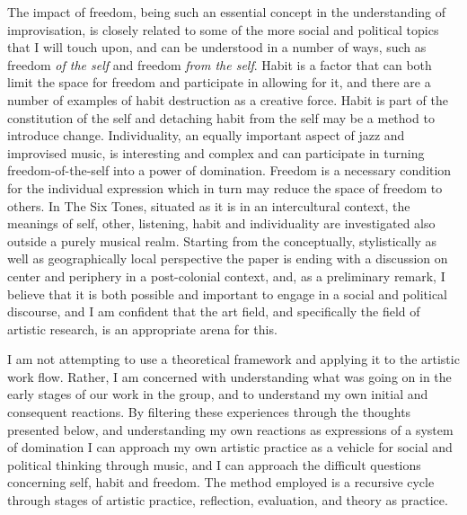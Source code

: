 \documentclass[a4paper]{article}
\begin{document}
The impact of freedom, being such an essential concept in the understanding of improvisation, is closely related to some of the more social and political topics that I will touch upon, and can be understood in a number of ways, such as freedom \emph{of the self} and freedom \emph{from the self}. Habit is a factor that can both limit the space for freedom and participate in allowing for it, and there are a number of examples of habit destruction as a creative force. Habit is part of the constitution of the self and detaching habit from the self may be a method to introduce change. Individuality, an equally important aspect of jazz and improvised music, is interesting and complex and can participate in turning freedom-of-the-self into a power of domination. Freedom is a necessary condition for the individual expression which in turn may reduce the space of freedom to others. In The Six Tones, situated as it is in an intercultural context, the meanings of self, other, listening, habit and individuality are investigated also outside a purely musical realm. 
Starting from the conceptually, stylistically as well as geographically local perspective the paper is ending with a discussion on center and periphery in a post-colonial context, and, as a preliminary remark, I believe that it is both possible and important to engage in a social and political discourse, and I am confident that the art field, and specifically the field of artistic research, is an appropriate arena for this.

I am not attempting to use a theoretical framework and applying it to the artistic work flow. Rather, I am concerned with understanding what was going on in the early stages of our work in the group, and to understand my own initial and consequent reactions. By filtering these experiences through the thoughts presented below, and understanding my own reactions as expressions of a system of domination I can approach my own artistic practice as a vehicle for social and political thinking through music, and I can approach the difficult questions concerning self, habit and freedom. The method employed is a recursive cycle through stages of artistic practice, reflection, evaluation, and theory as practice. 

\section*{ }
\label{sec:self-artist-prod}
\end{document}

